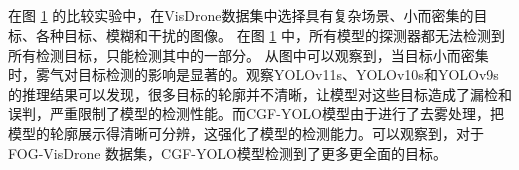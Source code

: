 \begin{figure}[H]
    \centering
        \\
        \\
        \\
        \\
    \captionsetup{font=footnotesize}
    \label{fig:fogvd_1}
\end{figure}

在图 \ref{fig:fogvd_1} 的比较实验中，在VisDrone数据集中选择具有复杂场景、小而密集的目标、各种目标、模糊和干扰的图像。
在图 \ref{fig:fogvd_1} 中，所有模型的探测器都无法检测到所有检测目标，只能检测其中的一部分。 从图中可以观察到，当目标小而密集时，雾气对目标检测的影响是显著的。观察YOLOv11s、YOLOv10s和YOLOv9s的推理结果可以发现，很多目标的轮廓并不清晰，让模型对这些目标造成了漏检和误判，严重限制了模型的检测性能。而CGF-YOLO模型由于进行了去雾处理，把模型的轮廓展示得清晰可分辨，这强化了模型的检测能力。可以观察到，对于FOG-VisDrone 数据集，CGF-YOLO模型检测到了更多更全面的目标。

